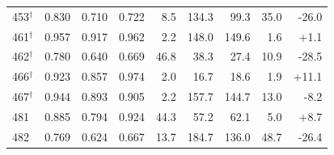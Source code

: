 {\begin{tabular}{@{}lrrrrrrrr@{}}
453$^\dagger$ & 0.830 & 0.710 & 0.722 & 8.5 & 134.3 & 99.3 & 35.0 & -26.0 \\
461$^\dagger$ & 0.957 & 0.917 & 0.962 & 2.2 & 148.0 & 149.6 & 1.6 & +1.1 \\
462$^\dagger$ & 0.780 & 0.640 & 0.669 & 46.8 & 38.3 & 27.4 & 10.9 & -28.5 \\
466$^\dagger$ & 0.923 & 0.857 & 0.974 & 2.0 & 16.7 & 18.6 & 1.9 & +11.1 \\
467$^\dagger$ & 0.944 & 0.893 & 0.905 & 2.2 & 157.7 & 144.7 & 13.0 & -8.2 \\
481 & 0.885 & 0.794 & 0.924 & 44.3 & 57.2 & 62.1 & 5.0 & +8.7 \\
482 & 0.769 & 0.624 & 0.667 & 13.7 & 184.7 & 136.0 & 48.7 & -26.4 \\
\bottomrule
\end{tabular}
}
